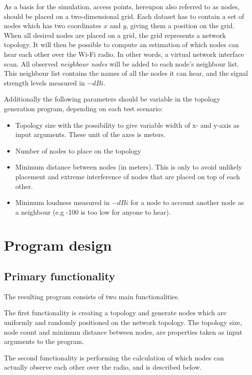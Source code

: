 As a basis for the simulation, access points, hereupon also referred to as nodes, should be placed on a two-dimensional grid. Each dataset has to contain a set of nodes which has two coordinates $x$ and $y$, giving them a position on the grid. When all desired nodes are placed on a grid, the grid represents a network topology. It will then be possible to compute an
estimation of which nodes can hear each other over the Wi-Fi radio. In other words, a virtual network interface scan. All observed \textit{neighbour nodes} will be added to each node's
neighbour list. This neighbour list contains the names of all the nodes it can hear, and the signal strength levels measured in $-dBi$.

Additionally the following parameters should be variable in the topology generation program, depending on each test scenario:

\begin{itemize}
	\item Topology size with the possibility to give variable width of x- and y-axis as input arguments. These unit of the axes is meters. 
	\item Number of nodes to place on the topology
	\item Minimum distance between nodes (in meters). This is only to avoid unlikely placement and extreme interference of nodes that are placed on top of each other. 
	\item Minimum loudness measured in $-dBi$ for a node to account another node as a neighbour (e.g -100 is too low for anyone to hear).
\end{itemize}


	\section{Program design}\label{prog_design}
	\subsection{Primary functionality}
	The resulting program consists of two main functionalities.

	The first functionality is creating a topology and generate nodes which are uniformly
	and randomly positioned on the network topology. The topology size, node count and minimum distance
	between nodes, are properties taken as input arguments to the program.

	The second functionality is performing the calculation of which nodes can actually observe each other over the radio, and is described below.

